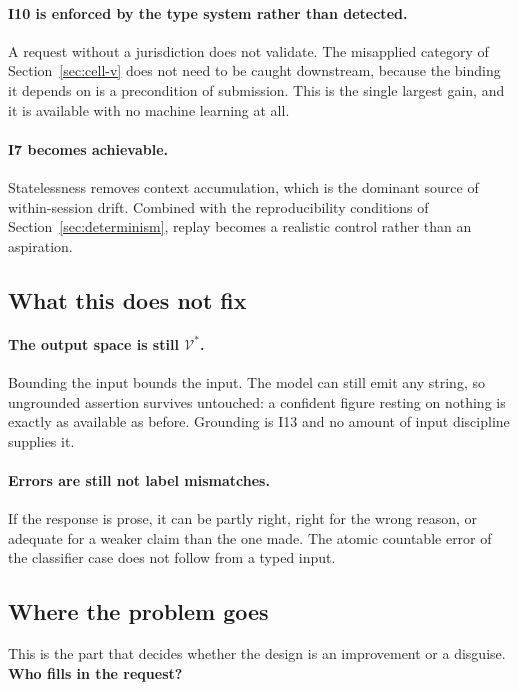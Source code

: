 \documentclass[11pt]{article}
\theoremstyle{plain}
\theoremstyle{definition}
\begin{document}
\paragraph{I10 is enforced by the type system rather than detected.} A request without
a jurisdiction does not validate. The misapplied category of
Section~\ref{sec:cell-v} does not need to be caught downstream, because the binding
it depends on is a precondition of submission. This is the single largest gain, and
it is available with no machine learning at all.

\paragraph{I7 becomes achievable.} Statelessness removes context accumulation, which
is the dominant source of within-session drift. Combined with the reproducibility
conditions of Section~\ref{sec:determinism}, replay becomes a realistic control
rather than an aspiration.

\subsection{What this does not fix}

\paragraph{The output space is still $\mathcal{V}^{*}$.} Bounding the input bounds the
input. The model can still emit any string, so ungrounded assertion survives
untouched: a confident figure resting on nothing is exactly as available as before.
Grounding is I13 and no amount of input discipline supplies it.

\paragraph{Errors are still not label mismatches.} If the response is prose, it can be
partly right, right for the wrong reason, or adequate for a weaker claim than the one
made. The atomic countable error of the classifier case does not follow from a typed
input.

\subsection{Where the problem goes}
\label{sec:relocation}

This is the part that decides whether the design is an improvement or a disguise.
\textbf{Who fills in the request?}
\end{document}

